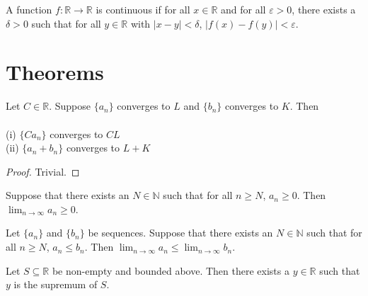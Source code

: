 \begin{definition}[continuous]
  \label{def:continuous}
  \leanok
  A function $f : \mathbb{R} → \mathbb{R}$ is continuous if for all $x \in \mathbb{R}$ and for all $\varepsilon > 0$, there exists a $\delta > 0$ such that for all $y ∈ \mathbb{R}$ with $|x - y| < \delta$, $|f(x) - f(y)| < \varepsilon$.
\end{definition}


\section{Theorems}


\begin{theorem}
  \label{thm:limit_laws}
  \leanok

  Let $C \in \mathbb{R}$. Suppose $\{a_n\}$ converges to $L$ and $\{b_n\}$ converges to $K$. Then \\ \\
  (i) $\{C a_n\}$ converges to $C L$ \\
  (ii) $\{a_n + b_n\}$ converges to $L + K$ 

\end{theorem}

\begin{proof}
  \leanok
  Trivial.
\end{proof}


\begin{lemma}
\label{lem:converges_nonneg}
  \leanok

  Suppose that there exists an $N \in ℕ$ such that for all $n \ge N$, $a_n ≥ 0$.
  Then $\lim_{n \to \infty} a_n ≥ 0$.

\end{lemma}

\begin{theorem}
  \label{thm:order_limit}
  \leanok

  Let $\{a_n\}$ and $\{b_n\}$ be sequences. 
  Suppose that there exists an $N ∈ ℕ$ such that for all $n ≥ N$, $a_n ≤ b_n$.
  Then $\lim_{n \to \infty} a_n \le \lim_{n \to \infty} b_n$.
\end{theorem}

\begin{theorem}
  \label{thm:exists_sup_of_bounded_above}
  \leanok
  Let $S \subseteq \mathbb{R}$ be non-empty and bounded above.
  Then there exists a $y \in \mathbb{R}$ such that $y$ is the supremum of $S$.

\end{theorem}

